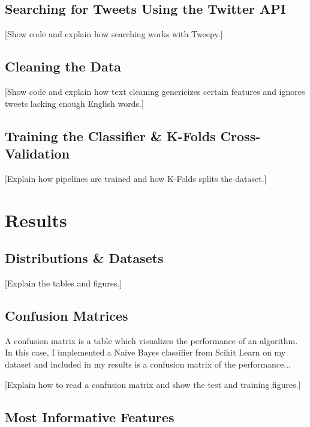 \documentclass[11pt, twoside, reqno]{book}
\begin{document}
\section{Searching for Tweets Using the Twitter API}
\label{searching_with_api}

[Show code and explain how searching works with Tweepy.]

\section{Cleaning the Data}
\label{cleaning_data}

[Show code and explain how text cleaning genericizes certain features and ignores tweets lacking enough English words.]

\section{Training the Classifier \& K-Folds Cross-Validation}
\label{training_and_k_folds}

[Explain how pipelines are trained and how K-Folds splits the dataset.]

\chapter{Results}
\label{results}

\section{Distributions \& Datasets}
\label{distributions_and_datasets}

[Explain the tables and figures.]

\section{Confusion Matrices}
\label{confusion_matrices}

A confusion matrix is a table which visualizes the performance of an algorithm. In this case, I implemented a Naive Bayes classifier from Scikit Learn on my dataset and included in my results is a confusion matrix of the performance...

[Explain how to read a confusion matrix and show the test and training figures.]

\section{Most Informative Features}
\label{most_informative_features}
\end{document}
